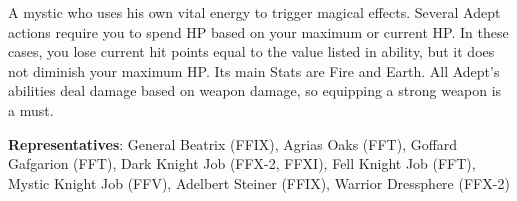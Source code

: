 \begin{jobdesc}[name=pjob-adept]
    A mystic who uses his own vital energy to trigger magical effects. Several Adept actions require you to spend HP based on your maximum or current HP\@. In these cases, you lose current hit points equal to the value listed in ability, but it does not diminish your maximum HP\@. Its main Stats are Fire and Earth. All Adept’s abilities deal damage based on weapon damage, so equipping a strong weapon is a must.\pc%

    \textbf{Representatives}:
    General Beatrix (FFIX),
    Agrias Oaks (FFT),
    Goffard Gafgarion (FFT),
    Dark Knight Job (FFX-2, FFXI),
    Fell Knight Job (FFT),
    Mystic Knight Job (FFV),
    Adelbert Steiner (FFIX),
    Warrior Dressphere (FFX-2)%
    \pc%

    \jobstats[hpa=4x,hpb=5x,hpc=6x,hpd=7x,mpa=1x,mpb=2x,mpc=3x,armor=Heavy,
    weapons=Claws/Gloves \\ Weapon \& Shield \\ Heavy Weapons \\ Katanas \\  Wands \\ Staves ]
\end{jobdesc}

